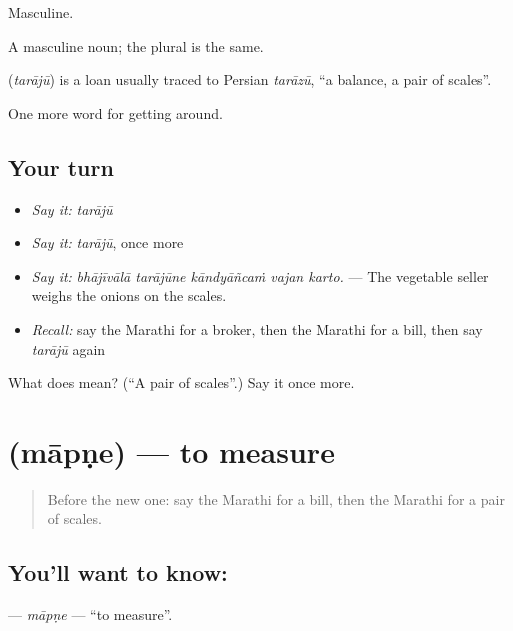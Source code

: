 Masculine.

A masculine noun; the plural is the same.

\begin{cousinweb}
\textbf{} (\emph{tarājū}) is a loan usually traced to Persian \emph{tarāzū}, \textquotedblleft{}a balance, a pair of scales\textquotedblright{}.
\end{cousinweb}

\begin{grammarlens}[title={What you've built}]
One more word for getting around.
\end{grammarlens}

\subsection*{Your turn}
\begin{itemize}
\raggedright
  \item \emph{Say it:} \emph{tarājū}
  \item \emph{Say it:} \emph{tarājū}, once more
  \item \emph{Say it:} \emph{bhājīvālā tarājūne kāndyāñcaṁ vajan karto.} — The vegetable seller weighs the onions on the scales.
  \item \emph{Recall:} say the Marathi for a broker, then the Marathi for a bill, then say \emph{tarājū} again
\end{itemize}

\begin{tcolorbox}[breakable,colback=teal!4,colframe=teal!35!black,title={Before you move on}]
What does  mean? (\textquotedblleft{}A pair of scales\textquotedblright{}.) Say it once more.
\end{tcolorbox}
\section[\texorpdfstring{\mr{मापणे} (māpṇe)}{मापणे (māpṇe)}]{ (māpṇe) — to measure}

\label{lesson:MR-C425-mapne}



\begin{quote}
Before the new one: say the Marathi for a bill, then the Marathi for a pair of scales.
\end{quote}

\subsection*{You'll want to know: }
\textbf{} — \emph{māpṇe} — \textquotedblleft{}to measure\textquotedblright{}.

